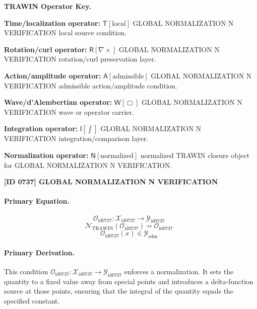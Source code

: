 \par\vspace{0.45\baselineskip}
\noindent\begin{minipage}[t]{\linewidth}
\begingroup
\small
\raggedright
\textbf{TRAWIN Operator Key.}\par
\noindent\textbf{Time/localization operator:} $\mathsf{T}\!\left[\mathrm{local}\right]$ GLOBAL NORMALIZATION N VERIFICATION local source condition.\par
\noindent\textbf{Rotation/curl operator:} $\mathsf{R}\!\left[\nabla\times\right]$ GLOBAL NORMALIZATION N VERIFICATION rotation/curl preservation layer.\par
\noindent\textbf{Action/amplitude operator:} $\mathsf{A}\!\left[\mathrm{admissible}\right]$ GLOBAL NORMALIZATION N VERIFICATION admissible action/amplitude condition.\par
\noindent\textbf{Wave/d'Alembertian operator:} $\mathsf{W}\!\left[\Box\right]$ GLOBAL NORMALIZATION N VERIFICATION wave or operator carrier.\par
\noindent\textbf{Integration operator:} $\mathsf{I}\!\left[\int\right]$ GLOBAL NORMALIZATION N VERIFICATION integration/comparison layer.\par
\noindent\textbf{Normalization operator:} $\mathsf{N}\!\left[\mathrm{normalized}\right]$ normalized TRAWIN closure object for GLOBAL NORMALIZATION N VERIFICATION.\par
\endgroup
\end{minipage}

\clearpage
\noindent\textbf{[ID 0737] GLOBAL NORMALIZATION N VERIFICATION}\par
\vspace{0.35em}
\paragraph{Primary Equation.}
\[
\mathcal{O}_{\mathrm{id0737}}:\mathcal{X}_{\mathrm{id0737}}\longrightarrow\mathcal{Y}_{\mathrm{id0737}}
\]
\[
\mathcal{N}_{\mathrm{TRAWIN}}(\mathcal{O}_{\mathrm{id0737}})=\mathcal{O}_{\mathrm{id0737}}
\]
\[
\mathcal{O}_{\mathrm{id0737}}(x)\in\mathcal{Y}_{\mathrm{adm}}
\]

\paragraph{Primary Derivation.}
This condition \( \mathcal{O}_{\mathrm{id0737}}:\mathcal{X}_{\mathrm{id0737}}\longrightarrow\mathcal{Y}_{\mathrm{id0737}} \) enforces a normalization. It sets the quantity to a fixed value away from special points and introduces a delta-function source at those points, ensuring that the integral of the quantity equals the specified constant.
